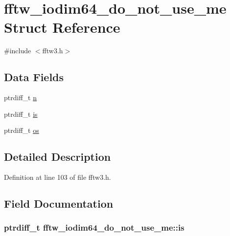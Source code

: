 \hypertarget{structfftw__iodim64__do__not__use__me}{\section{fftw\-\_\-iodim64\-\_\-do\-\_\-not\-\_\-use\-\_\-me \-Struct \-Reference}
\label{d5/d92/structfftw__iodim64__do__not__use__me}
}


{\ttfamily \#include $<$fftw3.\-h$>$}

\subsection*{\-Data \-Fields}
\begin{DoxyCompactItemize}
\item 
ptrdiff\-\_\-t \hyperlink{structfftw__iodim64__do__not__use__me_a19f8739d839b44db63c3aa1696a3a038}{n}
\item 
ptrdiff\-\_\-t \hyperlink{structfftw__iodim64__do__not__use__me_a1b9164674e2d091e8bde88c8d1bb7b6e}{is}
\item 
ptrdiff\-\_\-t \hyperlink{structfftw__iodim64__do__not__use__me_a44118d774124bdaa670f640537b151cf}{os}
\end{DoxyCompactItemize}


\subsection{\-Detailed \-Description}


\-Definition at line 103 of file fftw3.\-h.



\subsection{\-Field \-Documentation}
\hypertarget{structfftw__iodim64__do__not__use__me_a1b9164674e2d091e8bde88c8d1bb7b6e}{
\subsubsection[{is}]{\setlength{\rightskip}{0pt plus 5cm}ptrdiff\-\_\-t {\bf fftw\-\_\-iodim64\-\_\-do\-\_\-not\-\_\-use\-\_\-me\-::is}}}\label{d5/d92/structfftw__iodim64__do__not__use__me_a1b9164674e2d091e8bde88c8d1bb7b6e}


